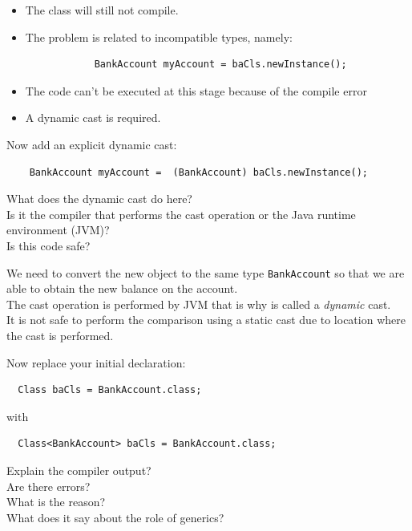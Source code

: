 \documentclass[11pt,a4paper]{exam}
\begin{document}
\begin{questions}
\begin{solution}
\begin{itemize}
\item The class will still not compile.
\item The problem is related to incompatible types, namely:
\begin{Verbatim}
            BankAccount myAccount = baCls.newInstance();
\end{Verbatim}
\item The code can't be executed at this stage because of the compile error 
\item A dynamic cast is required.
\end{itemize}	
\end{solution}

\item
Now add an explicit dynamic cast:
\begin{Verbatim}
    BankAccount myAccount =  (BankAccount) baCls.newInstance();
\end{Verbatim}

\noindent What does the dynamic cast do here? \\
Is it the compiler that performs the cast operation or the Java runtime environment (JVM)? \\
Is this code safe?

\begin{solution}
We need to convert the new object to the same type \verb!BankAccount! 
so that we are able to obtain the new balance on the account. \\
The cast operation is performed by JVM that is why is called a \emph{dynamic} cast.\\
It is not safe to perform the comparison using a static cast due to 
location where the cast is performed. 	
\end{solution}

\item
Now replace your initial declaration:
\begin{Verbatim}
  Class baCls = BankAccount.class;
\end{Verbatim}
with
\begin{Verbatim}
  Class<BankAccount> baCls = BankAccount.class;
\end{Verbatim}

\noindent
Explain the compiler output? \\
Are there errors? \\
What is the reason? \\
What does it say about the role of generics?


\end{questions}
\end{document}
